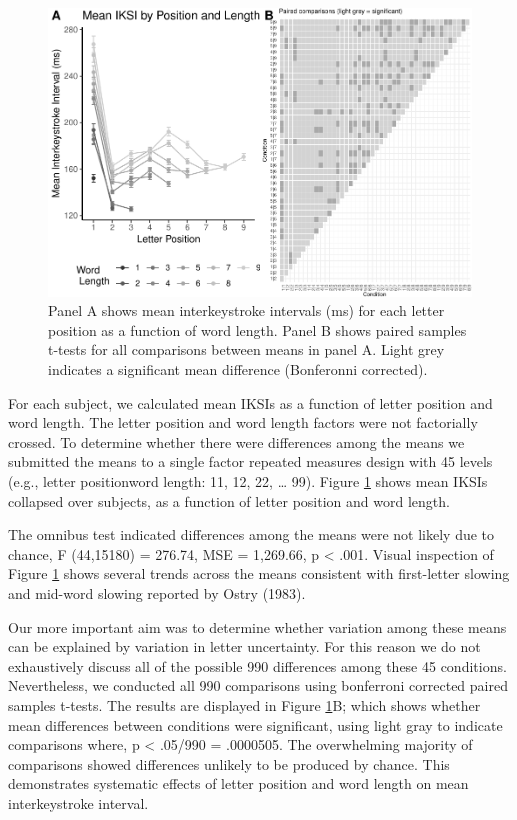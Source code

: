 \documentclass[floatsintext,man]{apa6}
\theoremstyle{definition}
\theoremstyle{definition}
\theoremstyle{definition}
\theoremstyle{remark}
\begin{document}
\begin{figure}[htbp]
\centering
\includegraphics{Entropy_typing_draft_files/figure-latex/typing-mean-iksis-comparisons-1.pdf}
\caption{\label{fig:typing-mean-iksis-comparisons}Panel A shows mean interkeystroke
intervals (ms) for each letter position as a function of word length.
Panel B shows paired samples t-tests for all comparisons between means
in panel A. Light grey indicates a significant mean difference
(Bonferonni corrected).}
\end{figure}

For each subject, we calculated mean IKSIs as a function of letter
position and word length. The letter position and word length factors
were not factorially crossed. To determine whether there were
differences among the means we submitted the means to a single factor
repeated measures design with 45 levels (e.g., letter
position\textbar{}word length: 1\textbar{}1, 1\textbar{}2, 2\textbar{}2,
\ldots{} 9\textbar{}9). Figure \ref{fig:typing-mean-iksis-comparisons}
shows mean IKSIs collapsed over subjects, as a function of letter
position and word length.

The omnibus test indicated differences among the means were not likely
due to chance, F (44,15180) = 276.74, MSE = 1,269.66, p \textless{}
.001. Visual inspection of Figure
\ref{fig:typing-mean-iksis-comparisons} shows several trends across the
means consistent with first-letter slowing and mid-word slowing reported
by Ostry (1983).

Our more important aim was to determine whether variation among these
means can be explained by variation in letter uncertainty. For this
reason we do not exhaustively discuss all of the possible 990
differences among these 45 conditions. Nevertheless, we conducted all
990 comparisons using bonferroni corrected paired samples t-tests. The
results are displayed in Figure
\ref{fig:typing-mean-iksis-comparisons}B; which shows whether mean
differences between conditions were significant, using light gray to
indicate comparisons where, p \textless{} .05/990 = .0000505. The
overwhelming majority of comparisons showed differences unlikely to be
produced by chance. This demonstrates systematic effects of letter
position and word length on mean interkeystroke interval.
\end{document}
